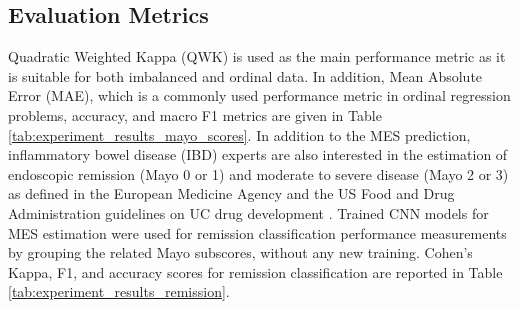 \documentclass[runningheads]{llncs}
\begin{document}
\subsection{Evaluation Metrics}

Quadratic Weighted Kappa (QWK) is used as the main performance metric as it is suitable for both imbalanced and ordinal data. In addition, Mean Absolute Error (MAE), which is a commonly used performance metric in ordinal regression problems, accuracy, and macro F1 metrics are given in Table \ref{tab:experiment_results_mayo_scores}. In addition to the MES prediction, inflammatory bowel disease (IBD) experts are also interested in the estimation of endoscopic remission (Mayo 0 or 1) and moderate to severe disease (Mayo 2 or 3) as defined in the European Medicine Agency and the US Food and Drug Administration guidelines on UC drug development \cite{REINISCH20191673}. Trained CNN models for MES estimation were used for remission classification performance measurements by grouping the related Mayo subscores, without any new training. Cohen's Kappa, F1, and accuracy scores for remission classification are reported in Table \ref{tab:experiment_results_remission}.
\end{document}

